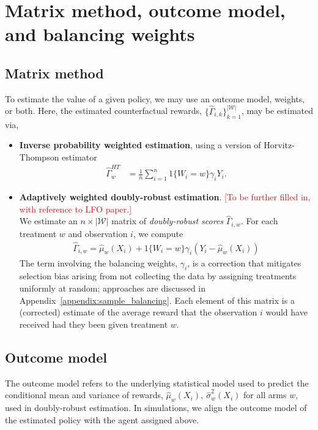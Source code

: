 \documentclass[letterpaper, 12pt, parskip=full, headsepline]{scrartcl}
\begin{document}
\section{Matrix method, outcome model, and balancing weights}
\subsection{Matrix method} 
To estimate the value of a given policy, we may use an outcome model, weights, or both. Here, the estimated counterfactual rewards, $\{\hat{\Gamma}_{i,k}\}_{k=1}^{|\mathcal{W}|}$, may be estimated via,
\begin{itemize}
\item \textbf{Inverse probability weighted estimation}, using a version of Horvitz-Thompson estimator \citep{horvitz1952}
\begin{align}
\hat{\Gamma}_w^{HT} & =  \frac{1}{n} \sum_{i = 1}^n 1 \{ W_i = w\} \gamma_i Y_i. 
\end{align}
\item \textbf{Adaptively weighted doubly-robust estimation}. 
\label{appendix:doubly-robust}
\textcolor{red}{[To be further filled in, with reference to LFO paper.]}\\
We estimate an $n \times |\mathcal{W}|$ matrix of \textit{doubly-robust scores} $\hat{\Gamma}_{i,w}$. For each treatment $w$ and observation $i$, we compute    
      \begin{align}
        \hat{\Gamma}_{i,w} = \hat{\mu}_{w}(X_{i}) + 1 \{W_i = w \} \gamma_{i}(Y_{i} - \hat{\mu}_w(X_i))
    \end{align}
  The term involving the balancing weights, $\gamma_i$, is a correction that mitigates selection bias arising from not collecting the data by assigning treatments uniformly at random; approaches are discussed in Appendix~\ref{appendix:sample_balancing}. Each element of this matrix is a (corrected) estimate of the average reward that the observation $i$ would have received had they been given treatment $w$.
\end{itemize}



\subsection{Outcome model} The {outcome model} refers to the underlying statistical model used to predict the conditional mean and variance of rewards, $\hat{\mu}_w(X_{i}), \ \hat{\sigma}_w^2(X_{i})$ for all arms $w$, used in doubly-robust estimation. In simulations, we align the outcome model of the estimated policy with the agent assigned above. 
\end{document}
